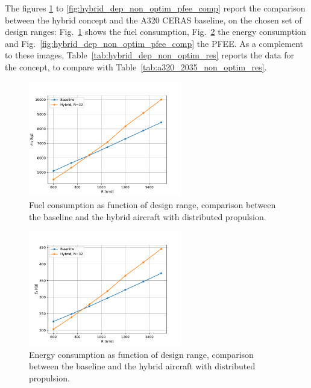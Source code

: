 The figures \ref{fig:hybrid_dep_non_optim_mf_comp} to \ref{fig:hybrid_dep_non_optim_pfee_comp} report the comparison between the hybrid concept and the A320 CERAS baseline, on the chosen set of design ranges: Fig.~\ref{fig:hybrid_dep_non_optim_mf_comp} shows the fuel consumption, Fig.~\ref{fig:hybrid_dep_non_optim_ec_comp} the energy consumption and Fig.~\ref{fig:hybrid_dep_non_optim_pfee_comp} the PFEE. 
As a complement to these images, Table~\ref{tab:hybrid_dep_non_optim_res} reports the data for the concept, to compare with Table~\ref{tab:a320_2035_non_optim_res}. 
\begin{figure}[!h]
	\centering
	\includegraphics[keepaspectratio, width=0.6\textwidth]{images/chap3/hybrid_dep_non_optim_mf_comp}
	\caption{Fuel consumption as function of design range, comparison between the baseline and the hybrid aircraft with distributed propulsion.}
	\label{fig:hybrid_dep_non_optim_mf_comp}
\end{figure}
\begin{figure}[!h]
	\centering
	\includegraphics[keepaspectratio, width=0.6\textwidth]{images/chap3/hybrid_dep_non_optim_ec_comp}
	\caption{Energy consumption as function of design range, comparison between the baseline and the hybrid aircraft with distributed propulsion.}
	\label{fig:hybrid_dep_non_optim_ec_comp}
\end{figure}

